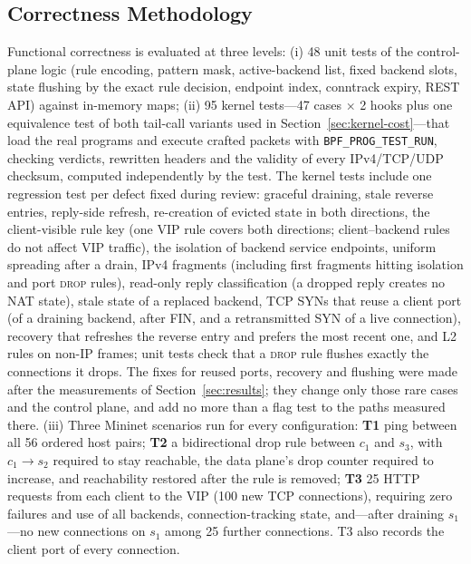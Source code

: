 \documentclass[conference]{IEEEtran}
\begin{document}
\subsection{Correctness Methodology}
Functional correctness is evaluated at three levels: (i) 48 unit tests of the
control-plane logic (rule encoding, pattern mask, active-backend list, fixed
backend slots, state flushing by the exact rule decision, endpoint index, conntrack expiry, REST API)
against in-memory maps; (ii) 95 kernel tests---47 cases $\times$ 2 hooks plus
one equivalence test of both tail-call variants used in
Section~\ref{sec:kernel-cost}---that load the real
programs and execute crafted packets with \texttt{BPF\_PROG\_TEST\_RUN},
checking verdicts, rewritten headers and the validity of every
IPv4/TCP/UDP checksum, computed independently by the test. The kernel tests
include one regression test per defect fixed during review: graceful
draining, stale reverse entries, reply-side refresh, re-creation of evicted
state in both directions, the client-visible rule key (one VIP rule covers
both directions; client--backend rules do not affect VIP traffic), the
isolation of backend service endpoints, uniform spreading after a drain,
IPv4 fragments (including first fragments hitting isolation and port
\textsc{drop} rules), read-only reply classification (a dropped reply creates
no NAT state), stale state of a replaced backend, TCP SYNs that reuse a client
port (of a draining backend, after FIN, and a retransmitted SYN of a live
connection), recovery that refreshes the reverse entry and prefers the most
recent one, and L2 rules on non-IP frames; unit tests check that a
\textsc{drop} rule flushes exactly the connections it drops. The fixes for
reused ports, recovery and flushing were made after the measurements of
Section~\ref{sec:results}; they change only those rare cases and the control
plane, and add no more than a flag test to the paths measured there. (iii) Three Mininet
scenarios run for every configuration: \textbf{T1} ping between all 56
ordered host pairs; \textbf{T2} a bidirectional drop rule between $c_1$ and
$s_3$, with $c_1 \to s_2$ required to stay reachable, the data plane's drop
counter required to increase, and reachability restored after the rule is
removed; \textbf{T3} 25 HTTP requests from each client to the VIP (100 new
TCP connections), requiring zero failures and use of all backends,
connection-tracking state, and---after draining $s_1$---no new connections on
$s_1$ among 25 further connections. T3 also records the client port of
every connection.
\end{document}
